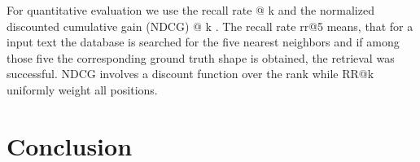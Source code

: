 \documentclass[10pt,twocolumn,letterpaper]{article}
\begin{document}
For quantitative evaluation we use the recall rate @ k and the normalized discounted cumulative gain (NDCG) @ k \cite{J_rvelin2002ndcg}. The recall rate rr@5 means, that for a input text the database is searched for the five nearest neighbors and if among those five the corresponding ground truth shape is obtained, the retrieval was successful. NDCG involves a discount function over the rank while RR@k uniformly weight all positions. 
\begin{table}[t]
	\label{tab:tab1}
	\caption{Comparison of the different models using the recall rate @ k and normalized discounted cumulative gain
@ k
	 }
\end{table}

\section{Conclusion}

{\small


}
\end{document}
